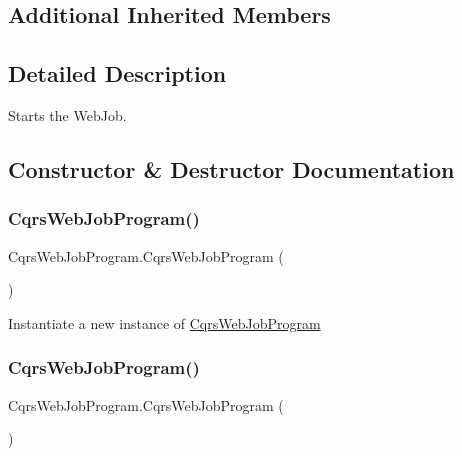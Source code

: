 \subsection*{Additional Inherited Members}


\subsection{Detailed Description}
Starts the Web\+Job. 



\subsection{Constructor \& Destructor Documentation}
\mbox{\label{classCqrsWebJobProgram_aef553539b5ec25d0cdb061fd9895c851_aef553539b5ec25d0cdb061fd9895c851}} 
\subsubsection{\texorpdfstring{Cqrs\+Web\+Job\+Program()}{CqrsWebJobProgram()}\hspace{0.1cm}{\footnotesize\ttfamily [1/2]}}
{\footnotesize\ttfamily Cqrs\+Web\+Job\+Program.\+Cqrs\+Web\+Job\+Program (\begin{DoxyParamCaption}{ }\end{DoxyParamCaption})}



Instantiate a new instance of \hyperlink{classCqrsWebJobProgram}{Cqrs\+Web\+Job\+Program} 

\mbox{\label{classCqrsWebJobProgram_aef553539b5ec25d0cdb061fd9895c851_aef553539b5ec25d0cdb061fd9895c851}} 
\subsubsection{\texorpdfstring{Cqrs\+Web\+Job\+Program()}{CqrsWebJobProgram()}\hspace{0.1cm}{\footnotesize\ttfamily [2/2]}}
{\footnotesize\ttfamily Cqrs\+Web\+Job\+Program.\+Cqrs\+Web\+Job\+Program (\begin{DoxyParamCaption}{ }\end{DoxyParamCaption})}



